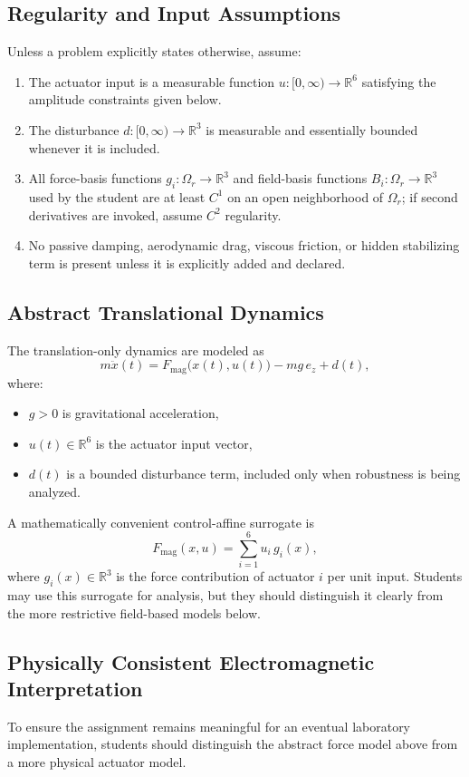 \documentclass[11pt]{article}
\begin{document}
\subsection{Regularity and Input Assumptions}
Unless a problem explicitly states otherwise, assume:
\begin{enumerate}[label=(A\arabic*), leftmargin=2.2em]
    \item The actuator input is a measurable function $u:[0,\infty)\to\mathbb{R}^6$ satisfying the amplitude constraints given below.
    \item The disturbance $d:[0,\infty)\to\mathbb{R}^3$ is measurable and essentially bounded whenever it is included.
    \item All force-basis functions $g_i:\Omega_r\to\mathbb{R}^3$ and field-basis functions $B_i:\Omega_r\to\mathbb{R}^3$ used by the student are at least $C^1$ on an open neighborhood of $\Omega_r$; if second derivatives are invoked, assume $C^2$ regularity.
    \item No passive damping, aerodynamic drag, viscous friction, or hidden stabilizing term is present unless it is explicitly added and declared.
\end{enumerate}

\subsection{Abstract Translational Dynamics}
The translation-only dynamics are modeled as
\[
 m\ddot{x}(t)=F_{\mathrm{mag}}\bigl(x(t),u(t)\bigr)-mg\,e_z+d(t),
\]
where:
\begin{itemize}[leftmargin=1.5em]
    \item $g>0$ is gravitational acceleration,
    \item $u(t)\in\mathbb{R}^6$ is the actuator input vector,
    \item $d(t)$ is a bounded disturbance term, included only when robustness is being analyzed.
\end{itemize}

A mathematically convenient control-affine surrogate is
\[
F_{\mathrm{mag}}(x,u)=\sum_{i=1}^6 u_i\,g_i(x),
\]
where $g_i(x)\in\mathbb{R}^3$ is the force contribution of actuator $i$ per unit input. Students may use this surrogate for analysis, but they should distinguish it clearly from the more restrictive field-based models below.

\subsection{Physically Consistent Electromagnetic Interpretation}
To ensure the assignment remains meaningful for an eventual laboratory implementation, students should distinguish the abstract force model above from a more physical actuator model.
\end{document}
